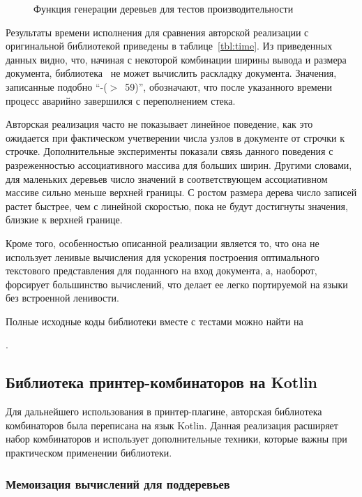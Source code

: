 \begin{figure}[h!]
  
  \caption{Функция генерации деревьев для тестов производительности}
  \label{fig:treeToDocMy}
\end{figure}

Результаты времени исполнения для сравнения авторской реализации с оригинальной библиотекой
приведены в таблице~\ref{tbl:time}.
Из приведенных данных видно, что, начиная с некоторой комбинации ширины вывода и размера документа,
библиотека~\cite{swierstra} не может вычислить раскладку документа.
Значения, записанные подобно \mbox{``-($>$ 59)''}, обозначают,
что после указанного времени процесс аварийно завершился с переполнением стека.

Авторская реализация часто не показывает линейное поведение, как это ожидается при фактическом
учетверении числа узлов в документе от строчки к строчке. Дополнительные эксперименты показали
связь данного поведения с разреженностью ассоциативного массива для больших ширин.
Другими словами, для маленьких деревьев число значений в соответствующем ассоциативном массиве
сильно меньше верхней границы. С ростом размера дерева число записей растет быстрее, чем
с линейной скоростью, пока не будут достигнуты значения, близкие к верхней границе.

Кроме того, особенностью описанной реализации является то, что она не использует 
ленивые вычисления для ускорения построения оптимального текстового представления для
поданного на вход документа, а, наоборот,
форсирует большинство вычислений, что делает ее легко портируемой на языки
без встроенной ленивости.

Полные исходные коды библиотеки вместе с тестами можно найти на

.



\newpage
\subsection{Библиотека принтер-комбинаторов на Kotlin}

Для дальнейшего использования в принтер-плагине, авторская библиотека комбинаторов была
переписана на язык Kotlin. Данная реализация расширяет набор комбинаторов и использует
дополнительные техники, которые важны при практическом применении библиотеки.

\subsubsection{Мемоизация вычислений для поддеревьев}

